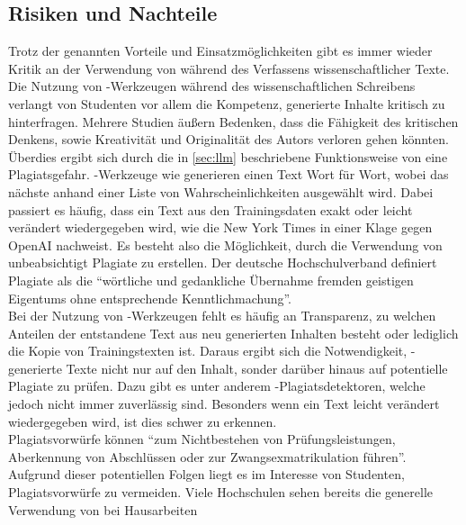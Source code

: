 \documentclass[../main.tex]{subfiles}
\begin{document}
\subsection{Risiken und Nachteile}
\label{sec:nachteile}

Trotz der genannten Vorteile und Einsatzmöglichkeiten gibt es immer wieder Kritik an der Verwendung von  während des Verfassens wissenschaftlicher Texte. 
Die Nutzung von -Werkzeugen während des wissenschaftlichen Schreibens verlangt von Studenten vor allem die Kompetenz, generierte Inhalte kritisch zu 
hinterfragen. Mehrere Studien äußern Bedenken, dass die Fähigkeit des kritischen Denkens, sowie Kreativität und Originalität des Autors verloren gehen könnten.\cite{ZukunftWissenschaftlichesPublizieren,teachers,BucherSchwarzerHolzwweißig}\\
Überdies ergibt sich durch die in \autoref{sec:llm} beschriebene Funktionsweise von  eine Plagiatsgefahr. -Werkzeuge wie  generieren einen Text Wort für Wort, wobei das nächste anhand 
einer Liste von Wahrscheinlichkeiten ausgewählt wird. Dabei passiert es häufig, dass ein Text aus den Trainingsdaten exakt oder leicht verändert wiedergegeben wird, wie die New York Times in 
einer Klage gegen OpenAI nachweist\cite{NYTimes}. Es besteht also die Möglichkeit, durch die Verwendung von  unbeabsichtigt Plagiate zu erstellen. Der deutsche Hochschulverband definiert Plagiate als 
die "`wörtliche und gedankliche Übernahme fremden geistigen Eigentums ohne entsprechende Kenntlichmachung"'\cite{Hochschulverband}. \\ Bei der Nutzung von -Werkzeugen fehlt es häufig an Transparenz, 
zu welchen Anteilen der entstandene Text aus neu generierten Inhalten besteht oder lediglich die Kopie von Trainingstexten ist. Daraus ergibt sich die Notwendigkeit, -generierte Texte nicht nur 
auf den Inhalt, sonder darüber hinaus auf potentielle Plagiate zu prüfen. Dazu gibt es unter anderem -Plagiatsdetektoren, welche jedoch nicht immer zuverlässig sind. Besonders wenn ein Text 
leicht verändert wiedergegeben wird, ist dies schwer zu erkennen.\\ Plagiatsvorwürfe können "`zum Nichtbestehen von Prüfungsleistungen, Aberkennung von Abschlüssen  oder  zur  Zwangsexmatrikulation  
führen"'\cite{Plagiate}. Aufgrund dieser potentiellen Folgen liegt es im Interesse von Studenten, Plagiatsvorwürfe zu vermeiden. Viele Hochschulen sehen bereits die generelle Verwendung von  bei Hausarbeiten 
\end{document}
